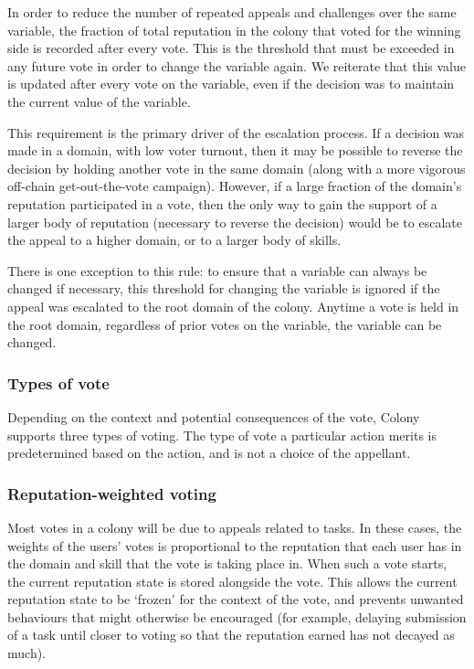 In order to reduce the number of repeated appeals and challenges over the same variable, the fraction of total reputation in the colony that voted for the winning side is recorded after every vote. This is the threshold that must be exceeded in any future vote in order to change the variable again. We reiterate that this value is updated after every vote on the variable, even if the decision was to maintain the current value of the variable.

This requirement is the primary driver of the escalation process. If a decision was made in a domain, with low voter turnout, then it may be possible to reverse the decision by holding another vote in the same domain (along with a more vigorous off-chain get-out-the-vote campaign). However, if a large fraction of the domain's reputation participated in a vote, then the only way to gain the support of a larger body of reputation (necessary to reverse the decision) would be to escalate the appeal to a higher domain, or to a larger body of skills.

There is one exception to this rule: to ensure that a variable can always be changed if necessary, this threshold for changing the variable is ignored if the appeal was escalated to the root domain of the colony. Anytime a vote is held in the root domain, regardless of prior votes on the variable, the variable can be changed.

\subsubsection{Types of vote}

Depending on the context and potential consequences of the vote, Colony supports three types of voting. The type of vote a particular action merits is predetermined based on the action, and is not a choice of the appellant.

\subsubsection*{Reputation-weighted voting}

Most votes in a colony will be due to appeals related to tasks. In these cases, the weights of the users' votes is proportional to the reputation that each user has in the domain and skill that the vote is taking place in. When such a vote starts, the current reputation state is stored alongside the vote. This allows the current reputation state to be `frozen' for the context of the vote, and prevents unwanted behaviours that might otherwise be encouraged (for example, delaying submission of a task until closer to voting so that the reputation earned has not decayed as much).

